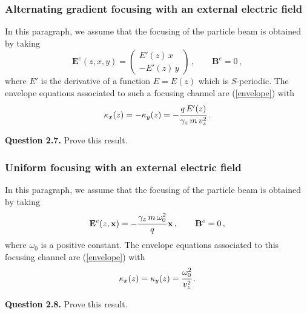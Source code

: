 \documentclass[10pt]{article}
\begin{document}
\subsubsection{Alternating gradient focusing with an external electric field}


In this paragraph, we assume that the focusing of the particle beam is obtained by taking
\begin{equation} \label{alternating_gradient_electric}
\mathbf{E}^{e}(z,x,y) = \left(
\begin{array}{c}
E'(z)\,x \\ -E'(z)\,y
\end{array}
\right) \, , \qquad \mathbf{B}^{e} = 0 \, ,
\end{equation}
where $E'$ is the derivative of a function $E = E(z)$ which is $S$-periodic. The envelope equations associated to such a focusing channel are (\ref{envelope}) with
\begin{equation}
\kappa_{x}(z) = -\kappa_{y}(z) = -\cfrac{q\,E'(z)}{\gamma_{z}\,m\,v_{z}^{2}} \, .
\end{equation}


\begin{leftbar}
\textbf{Question 2.7.\footnotemark[2]} Prove this result.
\end{leftbar}




\subsubsection{Uniform focusing with an external electric field}

In this paragraph, we assume that the focusing of the particle beam is obtained by taking
\begin{equation} \label{uniform_electric}
\mathbf{E}^{e}(z,\mathbf{x}) = -\cfrac{\gamma_{z}\,m\,\omega_{0}^{2}}{q}\, \mathbf{x} \, , \qquad \mathbf{B}^{e} = 0 \, ,
\end{equation}
where $\omega_{0}$ is a positive constant. The envelope equations associated to this focusing channel are (\ref{envelope}) with
\begin{equation}
\kappa_{x}(z) = \kappa_{y}(z) = \cfrac{\omega_{0}^{2}}{v_{z}^{2}} \, .
\end{equation}

\begin{leftbar}
\textbf{Question 2.8.\footnotemark[2]} Prove this result.
\end{leftbar}
\end{document}
